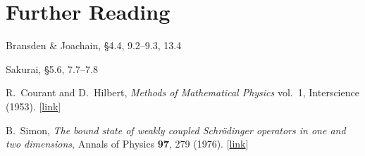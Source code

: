 \documentclass[pra,12pt]{revtex4}
\begin{document}
\section*{Further Reading}

\begin{enumerate}[[1{]}]
\item Bransden \& Joachain, \S4.4, 9.2--9.3, 13.4
\item Sakurai, \S5.6, 7.7--7.8

\item R.~Courant and D.~Hilbert, \textit{Methods of Mathematical
  Physics} vol.~1, Interscience (1953).  [\href{https://archive.org/details/MethodsOfMathematicalPhysicsVolume1/page/n337}{link}]
  \label{cite:CourantHilbert}

\item B.~Simon, \textit{The bound state of weakly coupled
  Schr\"odinger operators in one and two dimensions}, Annals of
  Physics \textbf{97}, 279 (1976). [\href{https://doi.org/10.1016/0003-4916(76)90038-5}{link}]
\label{cite:simon}
\end{enumerate}
\end{document}

